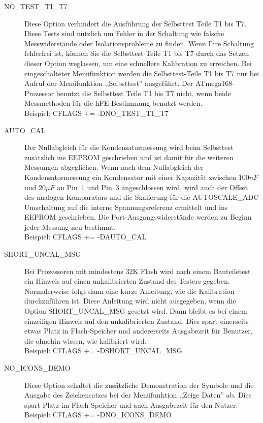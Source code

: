 \begin{description}
  \item[NO\_TEST\_T1\_T7] Diese Option verhindert die Ausführung der Selbsttest Teile T1 bis T7.
Diese Tests sind nützlich um Fehler in der Schaltung wie falsche Messwiderstände oder Isolationsprobleme zu finden.
Wenn Ihre Schaltung fehlerfrei ist, können Sie die Selbsttest-Teile T1 bis T7 durch das Setzen dieser Option weglassen, um eine
schnellere Kalibration zu erreichen.
Bei eingeschalteter Menüfunktion werden die Selbsttest-Teile T1 bis T7 nur bei Aufruf der Menüfunktion ,,Selbsttest'' ausgeführt.
Der ATmega168-Prozessor benutzt die Selbsttest Teile T1 bis T7 nicht, wenn beide Messmethoden für die hFE-Bestimmung benutzt werden.\\
Beispiel: CFLAGS += -DNO\_TEST\_T1\_T7

  \item[AUTO\_CAL] Der Nullabgleich für die Kondensatormessung wird beim
Selbsttest zusätzlich ins EEPROM geschrieben und ist damit für die weiteren Messungen abgeglichen.
Wenn nach dem Nullabgleich der Kondensatormessung ein Kondensator mit einer Kapazität zwischen \(100nF\) und \(20\mu F\) an Pin~1 und Pin~3 
angeschlossen wird, wird auch der Offset des analogen Komparators und die Skalierung für die AUTOSCALE\_ADC
Umschaltung auf die interne Spannungsreferenz ermittelt und ins EEPROM geschrieben.
Die Port-Ausgangswiderstände werden zu Beginn jeder Messung neu bestimmt. \\
Beispiel: CFLAGS += -DAUTO\_CAL

  \item[SHORT\_UNCAL\_MSG] Bei Prozessoren mit mindestens 32K Flash  wird nach einem Bauteiletest ein Hinweis auf einen unkalibrierten Zustand
des Testers gegeben. Normalerweise folgt dann eine kurze Anleitung, wie die Kalibration durchzuführen ist.
Diese Anleitung wird nicht ausgegeben, wenn die Option SHORT\_UNCAL\_MSG gesetzt wird.
Dann bleibt es bei einem einzeiligen Hinweis auf den unkalibrierten Zustand. 
Dies spart einerseits etwas Platz in Flash-Speicher und andererseits Ausgabezeit für Benutzer,
die ohnehin wissen, wie kalibriert wird.\\
Beispiel: CFLAGS += -DSHORT\_UNCAL\_MSG

 \item[NO\_ICONS\_DEMO]
Diese Option schaltet die zusätzliche Demonstration der Symbole und die Ausgabe des Zeichensatzes bei der Menüfunktion
,,Zeige Daten'' ab.
Dies spart Platz im Flash-Speicher und auch Ausgabezeit für den Nutzer.\\
Beispiel: CFLAGS += -DNO\_ICONS\_DEMO


\end{description}
